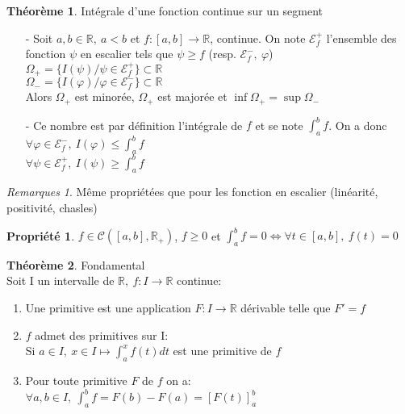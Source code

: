 \documentclass[fleqn]{article}
\theoremstyle{definition} \newtheorem*{defi}{D\'efinition}
\theoremstyle{definition} \newtheorem*{theo}{Th\'eor\`eme}
\theoremstyle{definition} \newtheorem*{coro}{Corollaire}
\theoremstyle{remark} \newtheorem*{rqs}{Remarques}
\theoremstyle{definition} \newtheorem*{prop}{Propri\'et\'e}
\begin{document}
\begin{theo} Int\'egrale d'une fonction continue sur un segment
	\begin{itemize}
		\item [-] Soit $a,b \in \mathbb{R},\ a<b$ et $f:[a,b] \rightarrow \mathbb{R}$, continue. On note $\mathcal{E}_f^+$ l'ensemble des
		fonction $\psi$
			en escalier tels que $\psi \geq f$ (resp. $\mathcal{E}_f^-,\ \varphi$) \\
			$\Omega_+ = \{I(\psi) / \psi \in \mathcal{E}_f^+\} \subset \mathbb{R}$ \\
			$\Omega_- = \{I(\varphi) / \varphi \in \mathcal{E}_f^-\} \subset \mathbb{R}$ \\
			Alors $\Omega_+$ est minor\'ee, $\Omega_+$ est major\'ee et $\inf \Omega_+ = \sup \Omega_-$
		\item [-] Ce nombre est par d\'efinition l'int\'egrale de $f$ et se note $\int_a^b f$. On a donc\\
			$\forall \varphi \in \mathcal{E}_f^-,\ I(\varphi) \leq \int_a^b f$\\
			$\forall \psi \in \mathcal{E}_f^+,\ I(\psi) \geq \int_a^b f$
	\end{itemize}
\end{theo}

\begin{rqs} M\^eme propri\'et\'ees que pour les fonction en escalier (lin\'earit\'e, positivit\'e, chasles)
\end{rqs}

\begin{prop} $f \in \mathscr{C}([a,b], \mathbb{R}_+)$, $f \geq 0$ et $\int_a^b f = 0 \Leftrightarrow \forall t \in [a,b],\ f(t) = 0$
\end{prop}

\begin{theo} Fondamental \\
	Soit I un intervalle de $\mathbb{R},\ f:I\rightarrow \mathbb{R}$ continue:
	\begin{enumerate}
		\item Une primitive est une application $F: I \rightarrow \mathbb{R}$ d\'erivable telle que $F' = f$
		\item $f$ admet des primitives sur I: \\
			Si $a \in I,\ x \in I \mapsto \int_a^x f(t)dt$ est une primitive de $f$
		\item Pour toute primitive $F$ de $f$ on a: \\
			$\forall a,b \in I,\ \int_a^b f = F(b) - F(a) = [F(t)]_a^b$
	\end{enumerate}
\end{theo}
\end{document}
